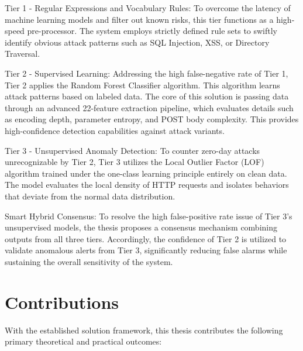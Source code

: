 \documentclass[../main.tex]{subfiles}
\begin{document}
Tier 1 - Regular Expressions and Vocabulary Rules: To overcome the latency of machine learning models and filter out known risks, this tier functions as a high-speed pre-processor. The system employs strictly defined rule sets to swiftly identify obvious attack patterns such as SQL Injection, XSS, or Directory Traversal.

Tier 2 - Supervised Learning: Addressing the high false-negative rate of Tier 1, Tier 2 applies the Random Forest Classifier algorithm. This algorithm learns attack patterns based on labeled data. The core of this solution is passing data through an advanced 22-feature extraction pipeline, which evaluates details such as encoding depth, parameter entropy, and POST body complexity. This provides high-confidence detection capabilities against attack variants.

Tier 3 - Unsupervised Anomaly Detection: To counter zero-day attacks unrecognizable by Tier 2, Tier 3 utilizes the Local Outlier Factor (LOF) algorithm trained under the one-class learning principle entirely on clean data. The model evaluates the local density of HTTP requests and isolates behaviors that deviate from the normal data distribution.

Smart Hybrid Consensus: To resolve the high false-positive rate issue of Tier 3's unsupervised models, the thesis proposes a consensus mechanism combining outputs from all three tiers. Accordingly, the confidence of Tier 2 is utilized to validate anomalous alerts from Tier 3, significantly reducing false alarms while sustaining the overall sensitivity of the system.

\section{Contributions}
With the established solution framework, this thesis contributes the following primary theoretical and practical outcomes:
\end{document}
